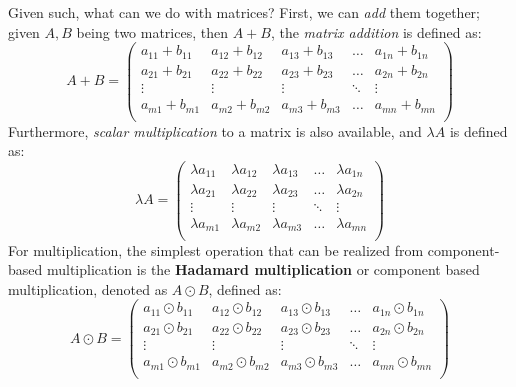 Given such, what can we do with matrices? First, we can \textit{add} them together; given $A,B$ being two matrices, then $A+B$, the \textit{matrix addition} is defined as: 
\begin{equation}
A + B = \begin{pmatrix}
            a_{11} + b_{11} & a_{12} + b_{12} & a_{13} + b_{13}& \dots & a_{1n}+ b_{1n}\\
            a_{21} + b_{21} & a_{22} + b_{22} & a_{23} + b_{23}& \dots & a_{2n}+ b_{2n}\\
            \vdots & \vdots & \vdots & \ddots & \vdots \\
            a_{m1} + b_{m1} & a_{m2} + b_{m2} & a_{m3} + b_{m3}& \dots & a_{mn}+ b_{mn}\\
        \end{pmatrix}
\end{equation}
Furthermore, \textit{scalar multiplication} to a matrix is also available, and $\lambda A$ is defined as: 
\begin{equation}
    \lambda A = \begin{pmatrix}
            \lambda a_{11} & \lambda a_{12} & \lambda a_{13} & \dots & \lambda a_{1n}\\
            \lambda a_{21} & \lambda a_{22} & \lambda a_{23} & \dots & \lambda a_{2n}\\
            \vdots & \vdots & \vdots & \ddots & \vdots \\
            \lambda a_{m1} & \lambda a_{m2} & \lambda a_{m3} & \dots & \lambda a_{mn}\\
        \end{pmatrix}
\end{equation}
For multiplication, the simplest operation that can be realized from component-based multiplication is the \textbf{Hadamard multiplication} or component based multiplication, denoted as $A\odot B$, defined as: 
\begin{equation}
    A\odot B = \begin{pmatrix}
            a_{11} \odot b_{11} & a_{12} \odot b_{12} & a_{13} \odot b_{13}& \dots & a_{1n}\odot b_{1n}\\
            a_{21} \odot b_{21} & a_{22} \odot b_{22} & a_{23} \odot b_{23}& \dots & a_{2n}\odot b_{2n}\\
            \vdots & \vdots & \vdots & \ddots & \vdots \\
            a_{m1} \odot b_{m1} & a_{m2} \odot b_{m2} & a_{m3} \odot b_{m3}& \dots & a_{mn}\odot b_{mn}\\
        \end{pmatrix}
\end{equation} 
